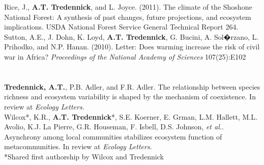 \documentclass[margin,line]{resume}
\begin{document}
\begin{resume}
   Rice, J., \textbf{A.T. Tredennick}, and L. Joyce. (2011). The climate of the Shoshone National Forest: A synthesis of past changes, future projections, and 			ecosystem implications. USDA National Forest Service General Technical Report 264. \vspace{-6mm}\\%
	
	Sutton, A.E., J. Dohn, K. Loyd, \textbf{A.T. Tredennick}, G. Bucini, A. Sol�rzano, L. Prihodko, and N.P. Hanan. (2010). Letter: Does warming increase the risk of civil war 	in Africa? \textsl{Proceedings of the National Academy of Sciences} 107(25):E102 \\ 
		
	\section{\textmd{\textsf{}}}
	\textbf{Tredennick, A.T.}, P.B. Adler, and F.R. Adler. The relationship between species richness and ecosystem variability is shaped by the mechanism of coexistence. In review at \emph{Ecology Letters}. \vspace{-6mm}\\
	
	Wilcox*, K.R., \textbf{A.T. Tredennick}*, S.E. Koerner, E. Grman, L.M. Hallett, M.L. Avolio, K.J. La Pierre, G.R. Houseman, F. Isbell, D.S. Johnson, \emph{et al.}. Asynchrony among local communities stabilizes ecosystem function of metacommunities. In review at \emph{Ecology Letters}. \\%
    \hspace{2em} \textsf{\footnotesize{*Shared first authorship by Wilcox and Tredennick}}
	
    

\end{resume}
\end{document}
